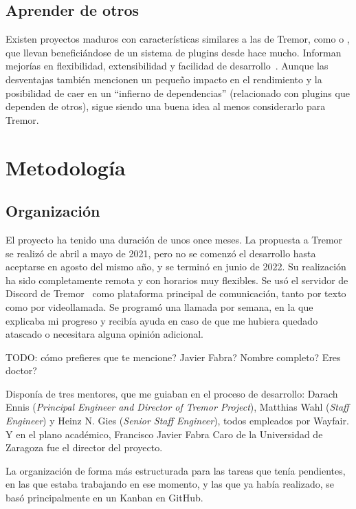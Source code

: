 \subsection{Aprender de otros}

Existen proyectos maduros con características similares a las de Tremor, como
 o , que llevan beneficiándose de un
sistema de plugins desde hace mucho. Informan mejorías en flexibilidad,
extensibilidad y facilidad de
desarrollo~\cite{nginxPluginsAdvantages}\cite{apachePluginsAdvantages}. Aunque
las desventajas también mencionen un pequeño impacto en el rendimiento y la
posibilidad de caer en un ``infierno de dependencias'' (relacionado con plugins
que dependen de otros), sigue siendo una buena idea al menos considerarlo para
Tremor.

\section{Metodología}

\subsection{Organización}

El proyecto ha tenido una duración de unos once meses. La propuesta a Tremor se
realizó de abril a mayo de 2021, pero no se comenzó el desarrollo hasta
aceptarse en agosto del mismo año, y se terminó en junio de 2022. Su realización
ha sido completamente remota y con horarios muy flexibles. Se usó el servidor de
Discord de Tremor~\cite{tremor_discord} como plataforma principal de
comunicación, tanto por texto como por videollamada. Se programó una llamada por
semana, en la que explicaba mi progreso y recibía ayuda en caso de que me
hubiera quedado atascado o necesitara alguna opinión adicional.

TODO: cómo prefieres que te mencione? Javier Fabra? Nombre completo? Eres
doctor?

Disponía de tres mentores, que me guiaban en el proceso de desarrollo: Darach
Ennis (\emph{Principal Engineer and Director of Tremor Project}), Matthias Wahl
(\emph{Staff Engineer}) y Heinz N. Gies (\emph{Senior Staff Engineer}), todos
empleados por Wayfair. Y en el plano académico, Francisco Javier Fabra Caro de
la Universidad de Zaragoza fue el director del proyecto.

La organización de forma más estructurada para las tareas que tenía pendientes,
en las que estaba trabajando en ese momento, y las que ya había realizado, se
basó principalmente en un Kanban en
GitHub.


